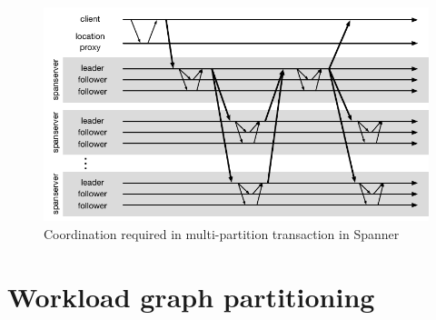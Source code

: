\begin{figure}
  \begin{minipage}[b]{1.0\linewidth}
  \centering
        \includegraphics[width=0.6\linewidth]{figures/spanner}
  \end{minipage}
  \caption{Coordination required in multi-partition transaction in Spanner}
  \label{fig:spanner}
\end{figure}

\section{Workload graph partitioning}









